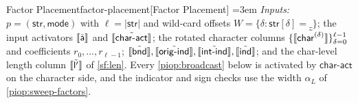\begin{DefinePIOP}{Factor Placement}{factor-placement}[Factor Placement]
  \emergencystretch=3em\relax
  \emph{Inputs:} $p=(\mathsf{str},\mathsf{mode})$ with $\ell=|\mathsf{str}|$ and wild-card offsets $W=\{\delta:\mathsf{str}[\delta]=\text{\_}\}$; the input activators $\llbracket\tilde{\mathsf{a}}\rrbracket$ and $\llbracket\tilde{\mathsf{char\text{-}act}}\rrbracket$; the rotated character columns $\{\llbracket\tilde{\mathsf{char}^{(\delta)}}\rrbracket\}_{\delta=0}^{\ell-1}$ and coefficients $r_0,\dots,r_{\ell-1}$; $\llbracket\tilde{\mathsf{bnd}}\rrbracket, \llbracket\tilde{\mathsf{orig\text{-}ind}}\rrbracket, \llbracket\tilde{\mathsf{int\text{-}ind}}\rrbracket, \llbracket\tilde{\mathsf{ind}}\rrbracket$; and the char-level length column $\llbracket\tilde{\mathsf{l}'}\rrbracket$ of \cref{sf:len}. Every \cref{piop:broadcast} below is activated by $\mathsf{char\text{-}act}$ on the character side, and the indicator and sign checks use the width $\alpha_L$ of \cref{piop:sweep-factors}.
  \vspace{1mm}


\end{DefinePIOP}
